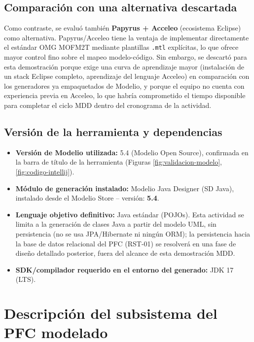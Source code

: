 \documentclass[11pt,a4paper]{article}
\begin{document}
\subsection{Comparación con una alternativa descartada}
Como contraste, se evaluó también \textbf{Papyrus + Acceleo} (ecosistema Eclipse)
como alternativa. Papyrus/Acceleo tiene la ventaja de
implementar directamente el estándar OMG MOFM2T mediante plantillas \texttt{.mtl}
explícitas, lo que ofrece mayor control fino sobre el mapeo modelo-código. Sin
embargo, se descartó para esta demostración porque exige una curva de aprendizaje
mayor (instalación de un stack Eclipse completo, aprendizaje del lenguaje Acceleo) en
comparación con los generadores ya empaquetados de Modelio, y porque el equipo no
cuenta con experiencia previa en Acceleo, lo que habría comprometido el tiempo
disponible para completar el ciclo MDD dentro del cronograma de la actividad.

\subsection{Versión de la herramienta y dependencias}
\begin{itemize}[leftmargin=1.5em]
    \item \textbf{Versión de Modelio utilizada:} 5.4 (Modelio Open Source),
    confirmada en la barra de título de la herramienta (Figuras
    \ref{fig:validacion-modelo}, \ref{fig:codigo-intellij}).
    \item \textbf{Módulo de generación instalado:} Modelio Java Designer (SD
    Java), instalado desde el Modelio Store -- versión: \textbf{5.4}.
    \item \textbf{Lenguaje objetivo definitivo:} Java estándar (POJOs). Esta
    actividad se limita a la generación de clases Java a partir del modelo UML,
    sin persistencia (no se usa JPA/Hibernate ni ningún ORM); la persistencia
    hacia la base de datos relacional del PFC (RST-01) se resolverá en una fase
    de diseño detallado posterior, fuera del alcance de esta demostración MDD.
    \item \textbf{SDK/compilador requerido en el entorno del generado:} JDK 17
    (LTS).
\end{itemize}



\section{Descripción del subsistema del PFC modelado}
\label{sec:descripcion-subsistema}
\end{document}

